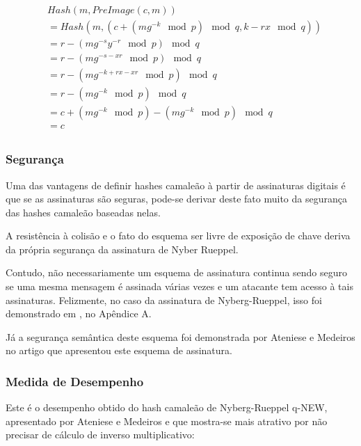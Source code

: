\documentclass[a4paper]{article}
\begin{document}
    \begin{equation*}
      \begin{split}
        &Hash(m, PreImage(c, m))\\
        &= Hash(m, (c+(mg^{-k} \mod p) \mod q, k-rx \mod q))\\
        &= r-(mg^{-s}y^{-r} \mod p) \mod q\\
        &= r-(mg^{-s-xr} \mod p) \mod q\\
        &= r-(mg^{-k+rx-xr} \mod p) \mod q\\
        &= r-(mg^{-k} \mod p) \mod q\\
        &= c+(mg^{-k} \mod p)-(mg^{-k} \mod p) \mod q\\
        &= c\\
      \end{split}
    \end{equation*}
    
    \subsubsection{Segurança}
    
    Uma das vantagens de definir hashes camaleão à partir de assinaturas
    digitais é que se as assinaturas são seguras, pode-se derivar deste
    fato muito da segurança das hashes camaleão baseadas nelas.
    
    A resistência à colisão e o fato do esquema ser livre de exposição de
    chave deriva da própria segurança da assinatura de Nyber Rueppel.
    
    Contudo, não necessariamente um esquema de assinatura continua sendo
    seguro se uma mesma mensagem é assinada várias vezes e um atacante tem
    acesso à tais assinaturas. Felizmente, no caso da assinatura de
    Nyberg-Rueppel, isso foi demonstrado em \cite{twin}, no Apêndice A.
    
    Já a segurança semântica deste esquema foi demonstrada por Ateniese e
    Medeiros no artigo que apresentou este esquema de assinatura.
    
    \subsubsection{Medida de Desempenho}
    
    Este é o desempenho obtido do hash camaleão de Nyberg-Rueppel q-NEW,
    apresentado por Ateniese e Medeiros e que mostra-se mais atrativo por
    não precisar de cálculo de inverso multiplicativo:
    
\end{document}
